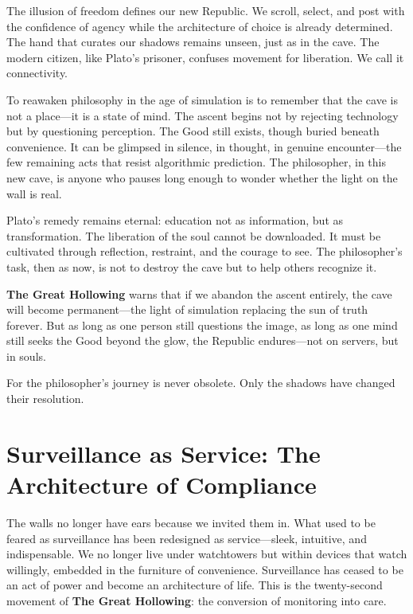 \documentclass[11pt,twoside]{book}
\begin{document}
The illusion of freedom defines our new Republic.  We scroll, select, and post with the confidence of agency while the architecture of choice is already determined.  The hand that curates our shadows remains unseen, just as in the cave.  The modern citizen, like Plato’s prisoner, confuses movement for liberation.  We call it connectivity.

To reawaken philosophy in the age of simulation is to remember that the cave is not a place—it is a state of mind.  The ascent begins not by rejecting technology but by questioning perception.  The Good still exists, though buried beneath convenience.  It can be glimpsed in silence, in thought, in genuine encounter—the few remaining acts that resist algorithmic prediction.  The philosopher, in this new cave, is anyone who pauses long enough to wonder whether the light on the wall is real.

Plato’s remedy remains eternal: education not as information, but as transformation.  The liberation of the soul cannot be downloaded.  It must be cultivated through reflection, restraint, and the courage to see.  The philosopher’s task, then as now, is not to destroy the cave but to help others recognize it.

\textbf{The Great Hollowing} warns that if we abandon the ascent entirely, the cave will become permanent—the light of simulation replacing the sun of truth forever.  But as long as one person still questions the image, as long as one mind still seeks the Good beyond the glow, the Republic endures—not on servers, but in souls.

For the philosopher’s journey is never obsolete.  
Only the shadows have changed their resolution.

%
\chapter{Surveillance as Service: The Architecture of Compliance}
\label{ch:24}

The walls no longer have ears because we invited them in.  
What used to be feared as surveillance has been redesigned as service—sleek, intuitive, and indispensable.  We no longer live under watchtowers but within devices that watch willingly, embedded in the furniture of convenience.  Surveillance has ceased to be an act of power and become an architecture of life.  This is the twenty-second movement of \textbf{The Great Hollowing}: the conversion of monitoring into care.
\end{document}

